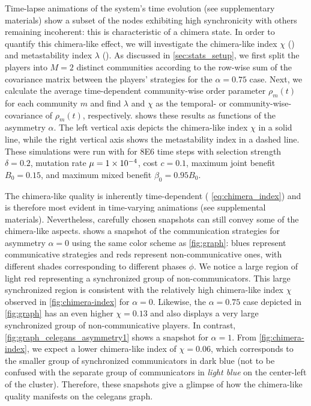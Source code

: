 \documentclass[pdflatex,lineno,referee,sn-nature]{sn-jnl}
\begin{document}
Time-lapse animations of the system's time evolution
(see supplementary materials)
show a subset of the nodes exhibiting high synchronicity
with others remaining incoherent: this is characteristic of a chimera state.
In order to quantify this chimera-like effect, we will investigate
the chimera-like index $\chi$ ()
and metastability index $\lambda$ ().
As discussed in \cref{sec:stats_setup},
we first split the players into $M=2$ distinct communities
according to the row-wise sum of the covariance matrix
between the players' strategies for the $\alpha = \num{0.75}$ case.
Next, we calculate the average time-dependent community-wise
order parameter $\rho_m(t)$
for each community $m$ and find $\lambda$ and $\chi$
as the temporal- or community-wise- covariance of
$\rho_m(t)$, respectively.
 shows these results
as functions of the asymmetry $\alpha$.
The left vertical axis depicts the chimera-like index $\chi$
in a solid line,
while the right vertical axis shows the metastability index
in a dashed line.
These simulations were run with
for \num{8E6} time steps with
selection strength $\delta = 0.2$,
mutation rate $\mu=\num{1E-4}$,
cost $c = \num{0.1}$,
maximum joint benefit $B_0 = 0.15$,
and maximum mixed benefit $\beta_0 = \num{0.95} B_0$.

The chimera-like quality is inherently time-dependent
(\cf{} \cref{eq:chimera_index})
and is therefore most evident in time-varying animations (see supplemental materials).
Nevertheless, carefully chosen snapshots can still convey some of the chimera-like aspects.
 shows a snapshot of the communication strategies
for asymmetry $\alpha = 0$ using the same color scheme as \cref{fig:graph}:
blues represent communicative strategies
and reds represent non-communicative ones,
with different shades corresponding to different phases $\phi$.
We notice a large region of light red representing a synchronized group of non-communicators.
This large synchronized region is consistent with the relatively high
chimera-like index $\chi$ observed in \cref{fig:chimera-index} for $\alpha = 0$.
Likewise, the $\alpha = 0.75$ case depicted in \cref{fig:graph}
has an even higher $\chi = \num{0.13}$ and also displays a very large
synchronized group of non-communicative players.
In contrast,
\cref{fig:graph_celegans_asymmetry1} shows a snapshot for $\alpha = 1$.
From \cref{fig:chimera-index}, we expect a lower chimera-like index
of $\chi = \num{0.06}$, which corresponds to the smaller group
of synchronized communicators in dark blue
(not to be confused with the separate group of communicators
in \emph{light blue} on the center-left of the cluster).
Therefore, these snapshots give a glimpse of how the chimera-like quality
manifests on the \gls{celegans} graph.
\end{document}
